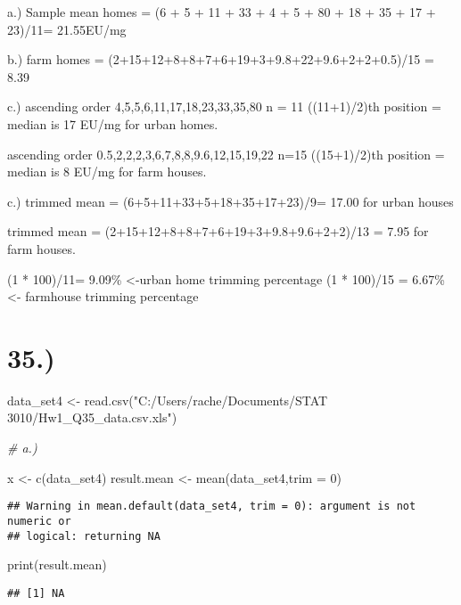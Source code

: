 \documentclass[
]{article}
\newenvironment{Shaded}{\begin{snugshade}}{\end{snugshade}}
\newcommand{\AttributeTok}[1]{\textcolor[rgb]{0.77,0.63,0.00}{#1}}
\newcommand{\CommentTok}[1]{\textcolor[rgb]{0.56,0.35,0.01}{\textit{#1}}}
\newcommand{\DecValTok}[1]{\textcolor[rgb]{0.00,0.00,0.81}{#1}}
\newcommand{\FunctionTok}[1]{\textcolor[rgb]{0.00,0.00,0.00}{#1}}
\newcommand{\NormalTok}[1]{#1}
\newcommand{\OtherTok}[1]{\textcolor[rgb]{0.56,0.35,0.01}{#1}}
\newcommand{\StringTok}[1]{\textcolor[rgb]{0.31,0.60,0.02}{#1}}
\begin{document}
a.) Sample mean homes = (6 + 5 + 11 + 33 + 4 + 5 + 80 + 18 + 35 + 17 +
23)/11= 21.55EU/mg

b.) farm homes = (2+15+12+8+8+7+6+19+3+9.8+22+9.6+2+2+0.5)/15 = 8.39

c.) ascending order 4,5,5,6,11,17,18,23,33,35,80 n = 11 ((11+1)/2)th
position = median is 17 EU/mg for urban homes.

ascending order 0.5,2,2,2,3,6,7,8,8,9.6,12,15,19,22 n=15 ((15+1)/2)th
position = median is 8 EU/mg for farm houses.

c.) trimmed mean = (6+5+11+33+5+18+35+17+23)/9= 17.00 for urban houses

trimmed mean = (2+15+12+8+8+7+6+19+3+9.8+9.6+2+2)/13 = 7.95 for farm
houses.

(1 * 100)/11= 9.09\% \textless-urban home trimming percentage (1 *
100)/15 = 6.67\% \textless- farmhouse trimming percentage

\hypertarget{section-3}{%
\section{35.)}\label{section-3}}

\begin{Shaded}
\begin{Highlighting}[]
\NormalTok{data\_set4 }\OtherTok{\textless{}{-}} \FunctionTok{read.csv}\NormalTok{(}\StringTok{"C:/Users/rache/Documents/STAT 3010/Hw1\_Q35\_data.csv.xls"}\NormalTok{)}

\CommentTok{\# a.)}

\NormalTok{x }\OtherTok{\textless{}{-}} \FunctionTok{c}\NormalTok{(data\_set4)}
\NormalTok{result.mean }\OtherTok{\textless{}{-}} \FunctionTok{mean}\NormalTok{(data\_set4,}\AttributeTok{trim =} \DecValTok{0}\NormalTok{)}
\end{Highlighting}
\end{Shaded}

\begin{verbatim}
## Warning in mean.default(data_set4, trim = 0): argument is not numeric or
## logical: returning NA
\end{verbatim}

\begin{Shaded}
\begin{Highlighting}[]
\FunctionTok{print}\NormalTok{(result.mean)}
\end{Highlighting}
\end{Shaded}

\begin{verbatim}
## [1] NA
\end{verbatim}
\end{document}
